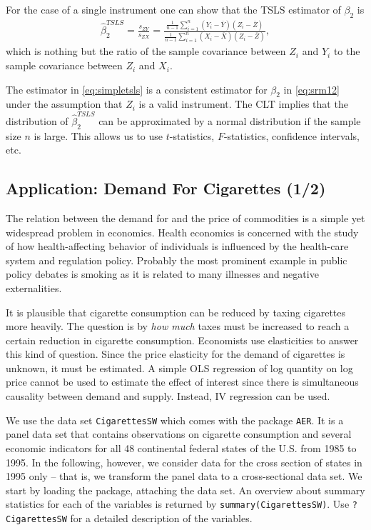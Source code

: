\documentclass[
  14pt,
]{memoir}
\begin{document}
For the case of a single instrument one can show that the TSLS estimator of \(\beta_2\) is
\begin{align}
\widehat{\beta}_2^{TSLS} = \frac{s_{ZY}}{s_{ZX}} = \frac{\frac{1}{n-1}\sum_{i=1}^n(Y_i - \overline{Y})(Z_i - \overline{Z})}{\frac{1}{n-1}\sum_{i=1}^n(X_i - \overline{X})(Z_i - \overline{Z})}, \label{eq:simpletsls}
\end{align}
which is nothing but the ratio of the sample covariance between \(Z_i\) and \(Y_i\) to the sample covariance between \(Z_i\) and \(X_i\).

The estimator in \eqref{eq:simpletsls} is a consistent estimator for \(\beta_2\) in \eqref{eq:srm12} under the assumption that \(Z_i\) is a valid instrument. The CLT implies that the distribution of \(\widehat{\beta}_2^{TSLS}\) can be approximated by a normal distribution if the sample size \(n\) is large. This allows us to use \(t\)-statistics, \(F\)-statistics, confidence intervals, etc.

\hypertarget{application-demand-for-cigarettes-12}{%
\subsection{Application: Demand For Cigarettes (1/2)}\label{application-demand-for-cigarettes-12}}

The relation between the demand for and the price of commodities is a simple yet widespread problem in economics. Health economics is concerned with the study of how health-affecting behavior of individuals is influenced by the health-care system and regulation policy. Probably the most prominent example in public policy debates is smoking as it is related to many illnesses and negative externalities.

It is plausible that cigarette consumption can be reduced by taxing cigarettes more heavily. The question is by \emph{how much} taxes must be increased to reach a certain reduction in cigarette consumption. Economists use elasticities to answer this kind of question. Since the price elasticity for the demand of cigarettes is unknown, it must be estimated. A simple OLS regression of log quantity on log price cannot be used to estimate the effect of interest since there is simultaneous causality between demand and supply. Instead, IV regression can be used.

We use the data set \texttt{CigarettesSW} which comes with the package \texttt{AER}. It is a panel data set that contains observations on cigarette consumption and several economic indicators for all 48 continental federal states of the U.S. from 1985 to 1995. In the following, however, we consider data for the cross section of states in 1995 only -- that is, we transform the panel data to a cross-sectional data set. We start by loading the package, attaching the data set. An overview about summary statistics for each of the variables is returned by \texttt{summary(CigarettesSW)}. Use \texttt{?CigarettesSW} for a detailed description of the variables.
\end{document}
